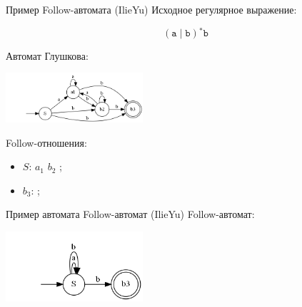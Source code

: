 \documentclass[mathserif]{beamer}
\def\alter{\ensuremath{\mathrel{\vert}}}%
\def\star{\ensuremath{^{*}}}%
\def\regexpstr#1{\mathtt{#1}}%
\begin{document}
\begin{frame}{Пример Follow-автомата (IlieYu)}
    Исходное регулярное выражение:

    \[(\regexpstr{a}\alter \regexpstr{b})\star\regexpstr{b}\]%

    Автомат Глушкова:

    \includegraphics[width=2in, keepaspectratio]{follow1.png}

    Follow-отношения:
    \begin{itemize}
        \item $S$: $a_{1}$ $b_{2}$ ;
        \item $b_{3}$: ;
    \end{itemize}

\end{frame}%

\begin{frame}{Пример автомата Follow-автомат (IlieYu)}
    Follow-автомат:

    \includegraphics[width=2in, keepaspectratio]{follow2.png}

\end{frame}%
\end{document}
